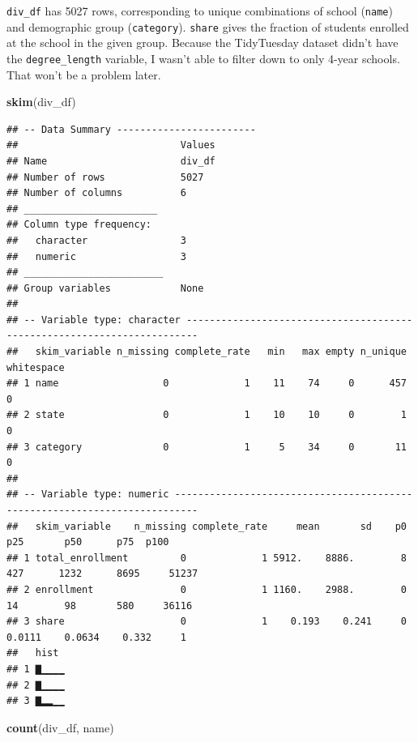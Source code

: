 \documentclass[
]{article}
\newenvironment{Shaded}{\begin{snugshade}}{\end{snugshade}}
\newcommand{\KeywordTok}[1]{\textcolor[rgb]{0.13,0.29,0.53}{\textbf{#1}}}
\newcommand{\NormalTok}[1]{#1}
\begin{document}
\texttt{div\_df} has 5027 rows, corresponding to unique combinations of school (\texttt{name}) and demographic group (\texttt{category}). \texttt{share} gives the fraction of students enrolled at the school in the given group. Because the TidyTuesday dataset didn't have the \texttt{degree\_length} variable, I wasn't able to filter down to only 4-year schools. That won't be a problem later.

\begin{Shaded}
\begin{Highlighting}[]
\KeywordTok{skim}\NormalTok{(div\_df)}
\end{Highlighting}
\end{Shaded}

\begin{verbatim}
## -- Data Summary ------------------------
##                            Values
## Name                       div_df
## Number of rows             5027  
## Number of columns          6     
## _______________________          
## Column type frequency:           
##   character                3     
##   numeric                  3     
## ________________________         
## Group variables            None  
## 
## -- Variable type: character ------------------------------------------------------------------------
##   skim_variable n_missing complete_rate   min   max empty n_unique whitespace
## 1 name                  0             1    11    74     0      457          0
## 2 state                 0             1    10    10     0        1          0
## 3 category              0             1     5    34     0       11          0
## 
## -- Variable type: numeric --------------------------------------------------------------------------
##   skim_variable    n_missing complete_rate     mean       sd    p0      p25       p50      p75  p100
## 1 total_enrollment         0             1 5912.    8886.        8 427      1232      8695     51237
## 2 enrollment               0             1 1160.    2988.        0  14        98       580     36116
## 3 share                    0             1    0.193    0.241     0   0.0111    0.0634    0.332     1
##   hist 
## 1 ▇▁▁▁▁
## 2 ▇▁▁▁▁
## 3 ▇▂▂▁▁
\end{verbatim}

\begin{Shaded}
\begin{Highlighting}[]
\KeywordTok{count}\NormalTok{(div\_df, name)}
\end{Highlighting}
\end{Shaded}
\end{document}
